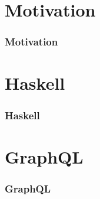 
\section{Motivation}

\begin{frame}{}
    \frametitle{Motivation}
\end{frame}

\section{Haskell}

\begin{frame}{}
    \frametitle{Haskell}
\end{frame}


\section{GraphQL}
\begin{frame}{}
    \frametitle{GraphQL}
\end{frame}
